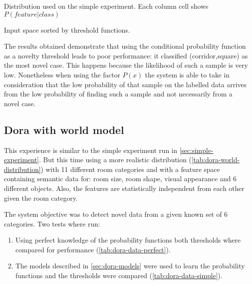 \documentclass[a4paper]{article}
\begin{document}
\begin{table}[hb]
\begin{center}

\end{center}
\caption{\label{tab:simple-distribution}Distribution used on the simple experiment. Each column cell shows $P(feature|class)$}
\end{table}

\begin{table}
\centering
{}
\qquad
{}
\caption{\label{tab:simple-data-sorted}Input space sorted by threshold functions.}
\end{table}

The results obtained demonstrate that using the conditional probability function
as a novelty threshold leads to poor performance: it classified (corridor,square) as
the most novel case.
This happens because the likelihood of such a sample is very low.
Nonetheless when using the factor $P(x)$ the system is able to take in consideration
that the low probability of that sample on the labelled data arrives from the low
probability of finding such a sample and not necessarily from a novel case.



\subsection{Dora with world model}
\label{sec:dora-experiment}

This experience is similar to the simple experiment run in \autoref{sec:simple-experiment}.
But this time using a more realistic distribution (\autoref{tab:dora-world-distribution}) with
11 different room categories and with a feature space containing semantic data for:
room size, room shape, visual appearance and 6 different objects.
Also, the features are statistically independent from each other given the room category.

The system objective was to detect novel data from a given known set of 6 categories.
Two tests where run:
\begin{enumerate}
\item Using perfect knowledge of the probability functions both thresholds where compared for performance (\autoref{tab:dora-data-perfect}).
\item The models described in \autoref{sec:dora-models} were used to learn the probability functions and the thresholds were compared (\autoref{tab:dora-data-simple}).
\end{enumerate}
\end{document}
